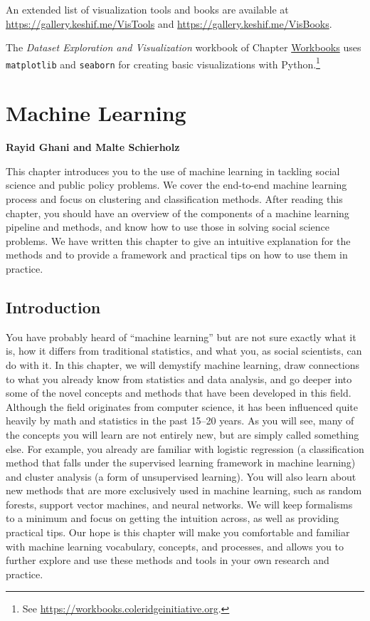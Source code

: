 \documentclass[]{krantz}
\begin{document}
An extended list of visualization tools and books are available at
\url{https://gallery.keshif.me/VisTools} and
\url{https://gallery.keshif.me/VisBooks}.

The \emph{Dataset Exploration and Visualization} workbook of Chapter
\protect\hyperlink{chap:workbooks}{Workbooks} uses \texttt{matplotlib}
and \texttt{seaborn} for creating basic visualizations with
Python.\footnote{See \url{https://workbooks.coleridgeinitiative.org}.}

\hypertarget{chap:ml}{\chapter{Machine Learning}\label{chap:ml}}

\textbf{Rayid Ghani and Malte Schierholz}

This chapter introduces you to the use of machine learning in tackling
social science and public policy problems. We cover the end-to-end
machine learning process and focus on clustering and classification
methods. After reading this chapter, you should have an overview of the
components of a machine learning pipeline and methods, and know how to
use those in solving social science problems. We have written this
chapter to give an intuitive explanation for the methods and to provide
a framework and practical tips on how to use them in practice.

\section{Introduction}\label{introduction-2}

You have probably heard of ``machine learning'' but are not sure exactly
what it is, how it differs from traditional statistics, and what you, as
social scientists, can do with it. In this chapter, we will demystify
machine learning, draw connections to what you already know from
statistics and data analysis, and go deeper into some of the novel
concepts and methods that have been developed in this field. Although
the field originates from computer science, it has been influenced quite
heavily by math and statistics in the past 15--20 years. As you will
see, many of the concepts you will learn are not entirely new, but are
simply called something else. For example, you already are familiar with
logistic regression (a classification method that falls under the
supervised learning framework in machine learning) and cluster analysis
(a form of unsupervised learning). You will also learn about new methods
that are more exclusively used in machine learning, such as random
forests, support vector machines, and neural networks. We will keep
formalisms to a minimum and focus on getting the intuition across, as
well as providing practical tips. Our hope is this chapter will make you
comfortable and familiar with machine learning vocabulary, concepts, and
processes, and allows you to further explore and use these methods and
tools in your own research and practice.
\end{document}
